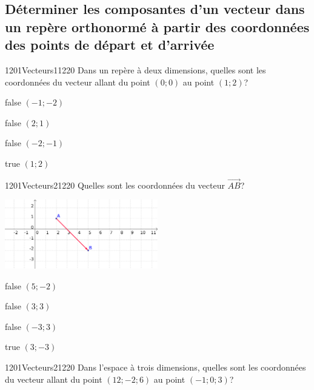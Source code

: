 \documentclass[11pt]{article}
\begin{document}
        \subsection{Déterminer les composantes d'un vecteur dans un repère orthonormé à partir des coordonnées des points de départ et d'arrivée}
        
        	\begin{question}{1201}{Vecteurs}{1}{1220}
				Dans un repère à deux dimensions, quelles sont les coordonnées du vecteur allant du point $(0;0)$ au point $(1;2)$?
            \end{question}

            \begin{reponses}
            	\item[false] $(-1;-2)$
            	\item[false] $(2;1)$
                \item[false] $(-2;-1)$
                \item[true] $(1;2)$
            \end{reponses}

            \begin{question}{1201}{Vecteurs}{2}{1220}
                Quelles sont les coordonnées du vecteur $\vec{AB}$?
                \begin{center}
                	\includegraphics[width=0.5\textwidth]{Philippe/Figures_Philippe/vecteurs_4_3.png}
                \end{center}
            \end{question}

            \begin{reponses}
                \item[false] $(5;-2)$
                \item[false] $(3;3)$
                \item[false] $(-3;3)$
                \item[true] $(3;-3)$ 
            \end{reponses}

            \begin{question}{1201}{Vecteurs}{2}{1220}
                Dans l'espace à trois dimensions, quelles sont les coordonnées du vecteur allant du point $(12;-2;6)$ au point $(-1;0;3)$?
            \end{question}
\end{document}
